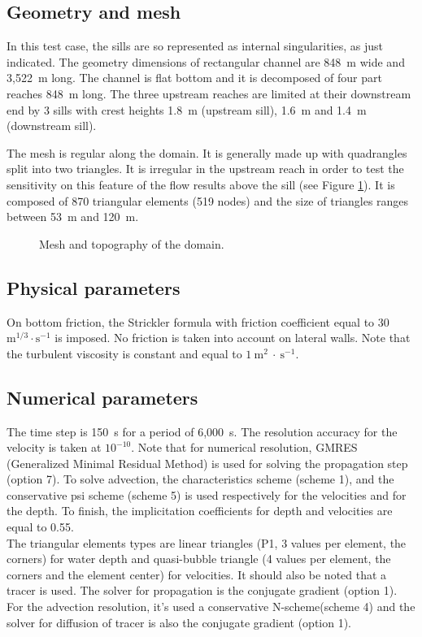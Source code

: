\subsection{Geometry and mesh}

In this test case, the sills  are so represented as internal
singularities, as just indicated.
The geometry dimensions of rectangular channel are 848~m wide
and  3,522~m long. The channel is flat bottom and it is decomposed
of four part reaches 848~m long. The three upstream reaches are limited
at their downstream end by 3 sills with crest heights 1.8~m (upstream sill),
1.6~m and 1.4~m (downstream sill).

The mesh is regular along the domain. It is generally made up
with quadrangles split into two triangles. It is irregular in
the upstream reach in order to test the sensitivity on this
feature of the flow results above the sill (see Figure \ref{t2d:weirs:fig:geo}).
It is composed of 870 triangular elements (519 nodes) and
the size of triangles ranges between 53~m and 120~m.

\begin{figure}[!htbp]
 \centering
 \caption{Mesh and topography of the domain.}
 \label{t2d:weirs:fig:geo}
\end{figure}

\subsection{Physical parameters}

On  bottom friction, the Strickler formula
with friction coefficient equal to
30~$\text{m}^{1/3}\cdot\text{s}^{-1}$ is imposed.
No friction is taken into account on lateral walls.
Note that the turbulent viscosity is constant and equal to $1~\text{m}^2~\cdot~\text{s}^{-1}$.

\subsection{Numerical parameters}

The time step is 150~s for a period of 6,000~s.
The resolution accuracy for the velocity is taken at $10^{-10}$.
Note that for numerical resolution, GMRES (Generalized Minimal Residual Method)
is used for solving the propagation step (option 7). To solve advection,
the characteristics scheme (scheme 1), and the conservative psi scheme (scheme 5)
is used respectively for the velocities and for the depth. To finish,
the implicitation coefficients for depth and velocities are equal to 0.55.\\
The triangular elements types are linear triangles (P1, 3 values per element, the corners)
for water depth and quasi-bubble triangle (4 values per element, the corners
and the element center) for velocities.
It should also be noted that a tracer is used. The solver for
propagation is the conjugate gradient (option 1). For the advection
resolution, it's used a conservative N-scheme(scheme 4) and the solver
for diffusion of tracer is also the conjugate gradient (option 1).

